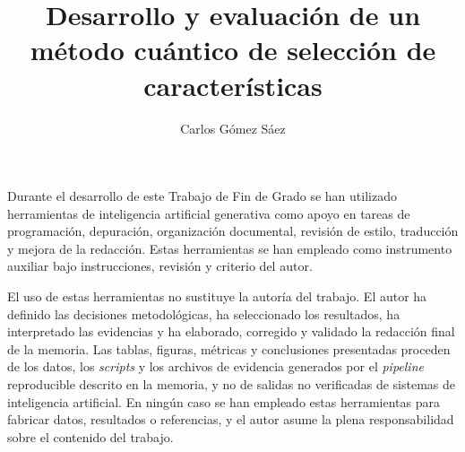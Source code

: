 \documentclass[twoside,spanish,a4paper,12pt]{tfg}
\title{Desarrollo y evaluación de un método cuántico de selección de características}
\author{Carlos Gómez Sáez}
\makeatletter
\renewcommand*{\cleardoublepage}{\clearpage\if@twoside
  \ifodd\c@page\else\hbox{}\thispagestyle{empty}\newpage
  \if@twocolumn\hbox{}\newpage\fi\fi\fi}
\makeatother
\begin{document}
\portada{}
\cleardoublepage{}

\thispagestyle{empty}
\vspace*{1\baselineskip}
\vspace{0.5\baselineskip}

\noindent Durante el desarrollo de este Trabajo de Fin de Grado se han
utilizado herramientas de inteligencia artificial generativa como apoyo
en tareas de programación, depuración, organización documental, revisión
de estilo, traducción y mejora de la redacción. Estas herramientas se
han empleado como instrumento auxiliar bajo instrucciones, revisión y
criterio del autor.

\noindent El uso de estas herramientas no sustituye la autoría del
trabajo. El autor ha definido las decisiones metodológicas, ha
seleccionado los resultados, ha interpretado las evidencias y ha
elaborado, corregido y validado la redacción final de la memoria. Las
tablas, figuras, métricas y conclusiones presentadas proceden de los
datos, los \textit{scripts} y los archivos de evidencia generados por el
\textit{pipeline} reproducible descrito en la memoria, y no de salidas no
verificadas de sistemas de inteligencia artificial. En ningún caso se han
empleado estas herramientas para fabricar datos, resultados o
referencias, y el autor asume la plena responsabilidad sobre el contenido
del trabajo.
\cleardoublepage{}

\contraportada{}
\cleardoublepage{}
\declaracion{}
\cleardoublepage{}
\end{document}

